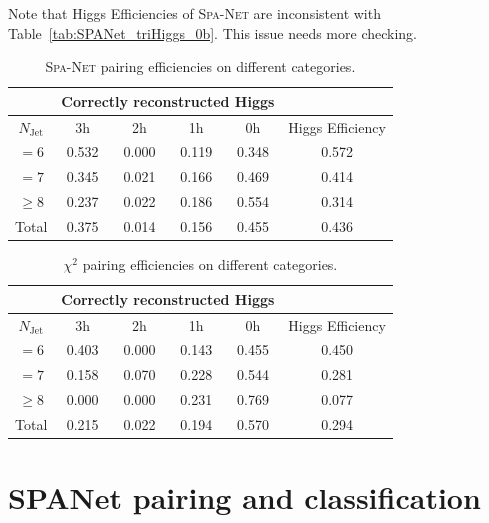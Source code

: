\documentclass[12pt]{article}
\begin{document}
	Note that Higgs Efficiencies of \textsc{Spa-Net} are inconsistent with Table~\ref{tab:SPANet_triHiggs_0b}. This issue needs more checking.
	\begin{table}[htpb]
		\centering
		\caption{\textsc{Spa-Net} pairing efficiencies on different categories.}
		\label{tab:SPANet_triHiggs_0b_1h2h3h}
		\begin{tabular}{c|cccc|c}
			\multicolumn{1}{l|}{} & \multicolumn{4}{c|}{Correctly reconstructed Higgs} & \multicolumn{1}{l}{} \\ \hline
			$N_\text{Jet}$        & 3h          & 2h         & 1h         & 0h         & Higgs Efficiency     \\ \hline
			$=6$                  & 0.532       & 0.000      & 0.119      & 0.348      & 0.572                \\
			$=7$                  & 0.345       & 0.021      & 0.166      & 0.469      & 0.414                \\
			$\ge 8$               & 0.237       & 0.022      & 0.186      & 0.554      & 0.314                \\ \hline
			Total                 & 0.375       & 0.014      & 0.156      & 0.455      & 0.436               
		\end{tabular}
	\end{table}
	\begin{table}[htpb]
		\centering
		\caption{$\chi^2$ pairing efficiencies on different categories.}
		\label{tab:chi2_pairing_triHiggs_0b_1h2h3h}
		\begin{tabular}{c|cccc|c}
			\multicolumn{1}{l|}{} & \multicolumn{4}{c|}{Correctly reconstructed Higgs} & \multicolumn{1}{l}{} \\ \hline
			$N_\text{Jet}$        & 3h          & 2h         & 1h         & 0h         & Higgs Efficiency     \\ \hline
			$=6$                  & 0.403       & 0.000      & 0.143      & 0.455      & 0.450                \\
			$=7$                  & 0.158       & 0.070      & 0.228      & 0.544      & 0.281                \\
			$\ge 8$               & 0.000       & 0.000      & 0.231      & 0.769      & 0.077                \\ \hline
			Total                 & 0.215       & 0.022      & 0.194      & 0.570      & 0.294               
		\end{tabular}
	\end{table}
\section{SPANet pairing and classification}%
\label{sec:spanet_pairing_and_classification}
	
\end{document}
